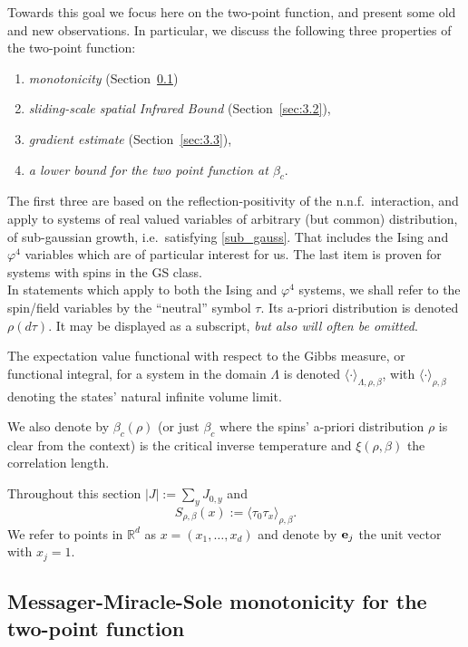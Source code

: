 \documentclass[a4paper,oneside,11pt]{article}
\newcommand{\be}[1]{\begin{equation}\label{#1}}
\newcommand{\ee}{\end{equation}}
\numberwithin{equation}{section}
\numberwithin{equation}{section}
\numberwithin{equation}{section}
\newcommand{\bbR}{\mathbb{R}}
\def\be{\begin{equation}}
\def\ee{\end{equation}}
\begin{document}
Towards this goal we focus here on the two-point function,  and present some old and new observations.  In particular, we discuss the following three properties of the two-point function: 
\begin{enumerate}[label=(\roman*)]
\item   {\em monotonicity} (Section~\ref{sec:3.1})
\item   {\em sliding-scale spatial Infrared Bound} (Section~\ref{sec:3.2}), 
\item   {\em gradient estimate} (Section~\ref{sec:3.3}),
\item {\em a lower bound for the two point function at $\beta_c$}.
\end{enumerate} 
The first three  are based on the reflection-positivity of the n.n.f.~interaction, and apply to systems of real valued variables of arbitrary (but common) distribution, of sub-gaussian growth, i.e.~satisfying 
\eqref{sub_gauss}.   
That includes the Ising and $\varphi^4$ variables which are of particular interest for us.  
The last item is proven for systems with spins in the GS class.   
\\ 


 In statements which apply  to both the Ising and $\varphi^4$ systems, we shall  refer to the spin/field variables by the ``neutral'' symbol $\tau$.   Its a-priori distribution is denoted 
$\rho(d\tau)$.   It may be displayed as a subscript, {\em but also will often be omitted}.    

The expectation value functional with respect to the Gibbs measure, or functional integral, for a system in the domain $\Lambda$  is denoted 
$\langle\cdot\rangle_{\Lambda,\rho, \beta}$, with $\langle\cdot\rangle_{\rho, \beta}$ denoting the states' natural infinite volume limit. 

 We also denote by 
$\beta_c(\rho)$  (or just $\beta_c$ where the spins' a-priori distribution $\rho$ is clear from the context) is the  critical inverse temperature and $\xi(\rho,\beta)$ the correlation length. 


Throughout this section  $|J|:=\sum_{y}J_{0,y}$ and 
\be
S_{\rho,\beta}(x):=\langle\tau_0\tau_x\rangle_{\rho,\beta}.
\ee 
We refer to points in  $\bbR^d$ as $x=(x_1,\dots,x_d)$
and denote by  ${\bf e}_j$ the unit vector with $x_j=1$.   






\subsection{Messager-Miracle-Sole monotonicity for the two-point function}\label{sec:3.1}
\end{document}
